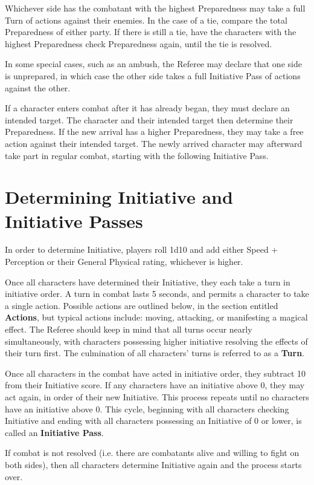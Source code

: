 \documentclass[oneside]{book}
\begin{document}
\begin{multicols}{2}
Whichever side has the combatant with the highest Preparedness may take a full Turn of actions against their enemies. In the case of a tie, compare the total Preparedness of either party. If there is still a tie, have the characters with the highest Preparedness check Preparedness again, until the tie is resolved.

In some special cases, such as an ambush, the Referee may declare that one side is unprepared, in which case the other side takes a full Initiative Pass of actions against the other. 

If a character enters combat after it has already began, they must declare an intended target. The character and their intended target then determine their Preparedness. If the new arrival has a higher Preparedness, they may take a free action against their intended target. The newly arrived character may afterward take part in regular combat, starting with the following Initiative Pass.

\section{Determining Initiative and Initiative Passes}
In order to determine Initiative, players roll 1d10 and add either Speed + Perception or their General Physical rating, whichever is higher.

Once all characters have determined their Initiative, they each take a 
turn in initiative order. A turn in combat lasts 5 seconds, and permits a character to take a single action. Possible actions are outlined below, in the section entitled \textbf{Actions}, but typical actions include: moving, attacking, or manifesting a magical effect. The Referee should keep in mind that all turns occur nearly simultaneously, with characters possessing higher initiative resolving the effects of their turn first. The culmination of all characters' turns is referred to as a \textbf{Turn}.

Once all characters in the combat have acted in initiative order, they subtract 10 from their Initiative score. If any characters have an initiative above 0, they may act again, in order of their new Initiative. This process repeats until no characters have an initiative  above 0. This cycle, beginning with all characters checking Initiative and ending with all characters possessing an Initiative of 0 or lower, is called an \textbf{Initiative Pass}.

If combat is not resolved (i.e. there are combatants alive and willing to fight on both sides), then all characters determine Initiative again and the process starts over. 


\end{multicols}
\end{document}
